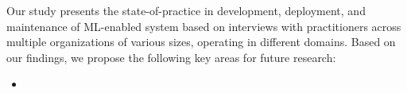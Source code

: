 
Our study presents the state-of-practice in development, deployment, and maintenance of ML-enabled system based on interviews with practitioners across multiple organizations of various sizes, operating in different domains. Based on our findings, we propose the following key areas for future research:
\begin{itemize}
    \item 
\end{itemize}



